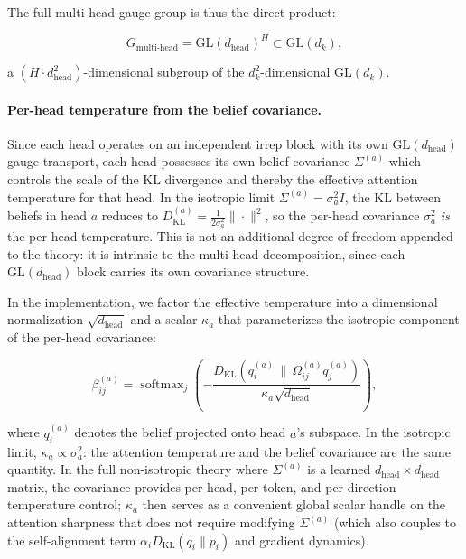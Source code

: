 \documentclass[twoside,11pt]{article}
\begin{document}
The full multi-head gauge group is thus the direct product:

\begin{equation}
G_{\text{multi-head}} = \mathrm{GL}(d_{\text{head}})^H \subset \mathrm{GL}(d_k),
\end{equation}

a $(H \cdot d_{\text{head}}^2)$-dimensional subgroup of the $d_k^2$-dimensional $\mathrm{GL}(d_k)$.

\paragraph{Per-head temperature from the belief covariance.}
Since each head operates on an independent irrep block with its own $\mathrm{GL}(d_{\text{head}})$ gauge transport, each head possesses its own belief covariance $\Sigma^{(a)}$ which controls the scale of the KL divergence and thereby the effective attention temperature for that head. In the isotropic limit $\Sigma^{(a)} = \sigma_a^2 I$, the KL between beliefs in head $a$ reduces to $D_{\mathrm{KL}}^{(a)} = \frac{1}{2\sigma_a^2}\|\cdot\|^2$, so the per-head covariance $\sigma_a^2$ \emph{is} the per-head temperature. This is not an additional degree of freedom appended to the theory: it is intrinsic to the multi-head decomposition, since each $\mathrm{GL}(d_{\text{head}})$ block carries its own covariance structure.

In the implementation, we factor the effective temperature into a dimensional normalization $\sqrt{d_{\text{head}}}$ and a scalar $\kappa_a$ that parameterizes the isotropic component of the per-head covariance:

\begin{equation}
\beta_{ij}^{(a)} = \operatorname{softmax}_j\!\left(-\frac{D_{\mathrm{KL}}(q_i^{(a)} \,\|\, \Omega_{ij}^{(a)} q_j^{(a)})}{\kappa_a \sqrt{d_{\text{head}}}}\right),
\label{eq:per_head_temperature}
\end{equation}

where $q_i^{(a)}$ denotes the belief projected onto head $a$'s subspace. In the isotropic limit, $\kappa_a \propto \sigma_a^2$: the attention temperature and the belief covariance are the same quantity. In the full non-isotropic theory where $\Sigma^{(a)}$ is a learned $d_{\text{head}} \times d_{\text{head}}$ matrix, the covariance provides per-head, per-token, and per-direction temperature control; $\kappa_a$ then serves as a convenient global scalar handle on the attention sharpness that does not require modifying $\Sigma^{(a)}$ (which also couples to the self-alignment term $\alpha_i D_{\mathrm{KL}}(q_i \| p_i)$ and gradient dynamics).
\end{document}
